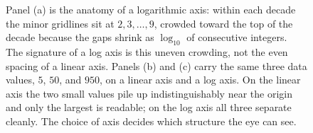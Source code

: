 \begin{figure}[htbp]
{%
}%
\caption[Anatomy of a log axis and the same data on two scales]{Panel
(a) is the anatomy of a logarithmic axis: within each decade the
minor gridlines sit at $2, 3, \ldots, 9$, crowded toward the top of
the decade because the gaps shrink as $\log_{10}$ of consecutive
integers. The signature of a log axis is this uneven crowding, not
the even spacing of a linear axis. Panels (b) and (c) carry the same
three data values, $5$, $50$, and $950$, on a linear axis and a log
axis. On the linear axis the two small values pile up
indistinguishably near the origin and only the largest is readable;
on the log axis all three separate cleanly. The choice of axis
decides which structure the eye can see.}
\label{fig:vol02:ch02:log-axis-reading}
\end{figure}
